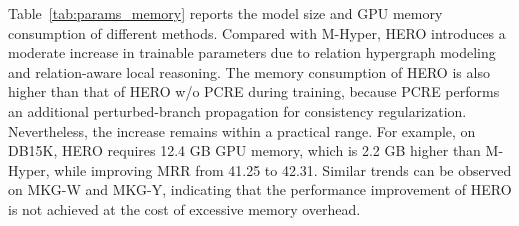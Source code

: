 \documentclass[a4paper,fleqn]{cas-sc}
\begin{document}
Table~\ref{tab:params_memory} reports the model size and GPU memory consumption of different methods. Compared with M-Hyper, HERO introduces a moderate increase in trainable parameters due to relation hypergraph modeling and relation-aware local reasoning. The memory consumption of HERO is also higher than that of HERO w/o PCRE during training, because PCRE performs an additional perturbed-branch propagation for consistency regularization. Nevertheless, the increase remains within a practical range. For example, on DB15K, HERO requires 12.4 GB GPU memory, which is 2.2 GB higher than M-Hyper, while improving MRR from 41.25 to 42.31. Similar trends can be observed on MKG-W and MKG-Y, indicating that the performance improvement of HERO is not achieved at the cost of excessive memory overhead.

\begin{table}[t]
\centering
\caption{Training and inference efficiency comparison. Training time denotes the average time per epoch, and inference time denotes the average time for evaluating the test set.}
\label{tab:runtime}
\end{table}
\end{document}
